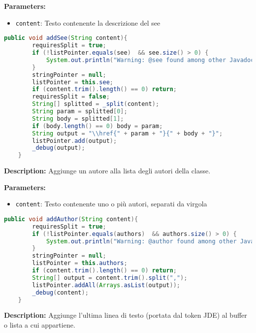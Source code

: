 \textbf{Parameters:}
\begin{itemize}
  \item\texttt{content}: Testo contenente la descrizione del see  
\end{itemize}

\begin{lstlisting}[language=Java]
    public void addSee(String content){
        requiresSplit = true;
        if (!listPointer.equals(see)  && see.size() > 0) {
            System.out.println("Warning: @see found among other Javadoc keywords. You should put all @see together.");
        }
        stringPointer = null;
        listPointer = this.see;
        if (content.trim().length() == 0) return;
        requiresSplit = false;
        String[] splitted = _split(content);
        String param = splitted[0];
        String body = splitted[1];
        if (body.length() == 0) body = param;
        String output = "\\href{" + param + "}{" + body + "}";
        listPointer.add(output);
        _debug(output);
    }
\end{lstlisting}
\vspace{0.5cm}
\textbf{Description:}  Aggiunge un autore alla lista degli autori della classe. 

\textbf{Parameters:}
\begin{itemize}
  \item\texttt{content}: Testo contenente uno o più autori, separati da virgola  
\end{itemize}

\begin{lstlisting}[language=Java]
    public void addAuthor(String content){
        requiresSplit = true;
        if (!listPointer.equals(authors)  && authors.size() > 0) {
            System.out.println("Warning: @author found among other Javadoc keywords. You should put all authors together.");
        }
        stringPointer = null;
        listPointer = this.authors;
        if (content.trim().length() == 0) return;
        String[] output = content.trim().split(",");
        listPointer.addAll(Arrays.asList(output));
        _debug(content);
    }
\end{lstlisting}
\vspace{0.5cm}
\textbf{Description:}  Aggiunge l'ultima linea di testo (portata dal token JDE) al buffer o lista a cui appartiene. 

